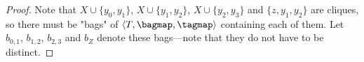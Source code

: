\begin{proof}
	
	Note that $X \cup \{y_0, y_1\}$, $X \cup \{y_1, y_2\}$, $X \cup \{y_2, y_3\}$
	and $\{z,y_1,y_2\}$ are cliques, so there must be "bags" of $\langle T, \bagmap, \tagmap \rangle$ containing each of them. Let $b_{0,1}$, $b_{1,2}$, $b_{2,3}$ and $b_Z$ denote these bags---note that they do not have to be distinct.


\end{proof}
